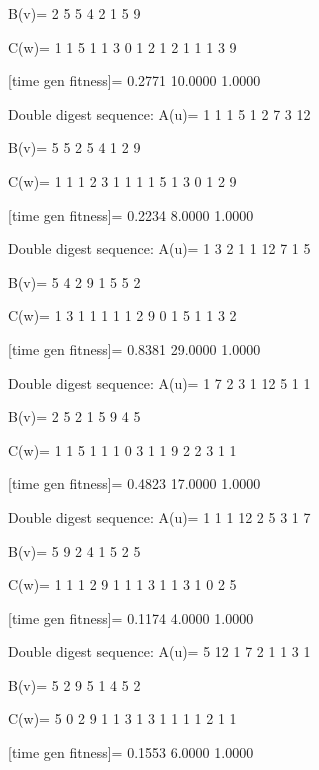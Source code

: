 B(v)=
     2     5     5     4     2     1     5     9

C(w)=
     1     1     5     1     1     3     0     1     2     1     2     1     1     1     3     9

[time gen fitness]=
    0.2771   10.0000    1.0000

Double digest sequence:
A(u)=
     1     1     1     5     1     2     7     3    12

B(v)=
     5     5     2     5     4     1     2     9

C(w)=
     1     1     1     2     3     1     1     1     1     5     1     3     0     1     2     9

[time gen fitness]=
    0.2234    8.0000    1.0000

Double digest sequence:
A(u)=
     1     3     2     1     1    12     7     1     5

B(v)=
     5     4     2     9     1     5     5     2

C(w)=
     1     3     1     1     1     1     1     2     9     0     1     5     1     1     3     2

[time gen fitness]=
    0.8381   29.0000    1.0000

Double digest sequence:
A(u)=
     1     7     2     3     1    12     5     1     1

B(v)=
     2     5     2     1     5     9     4     5

C(w)=
     1     1     5     1     1     1     0     3     1     1     9     2     2     3     1     1

[time gen fitness]=
    0.4823   17.0000    1.0000

Double digest sequence:
A(u)=
     1     1     1    12     2     5     3     1     7

B(v)=
     5     9     2     4     1     5     2     5

C(w)=
     1     1     1     2     9     1     1     1     3     1     1     3     1     0     2     5

[time gen fitness]=
    0.1174    4.0000    1.0000

Double digest sequence:
A(u)=
     5    12     1     7     2     1     1     3     1

B(v)=
     5     2     9     5     1     4     5     2

C(w)=
     5     0     2     9     1     1     3     1     3     1     1     1     1     2     1     1

[time gen fitness]=
    0.1553    6.0000    1.0000

